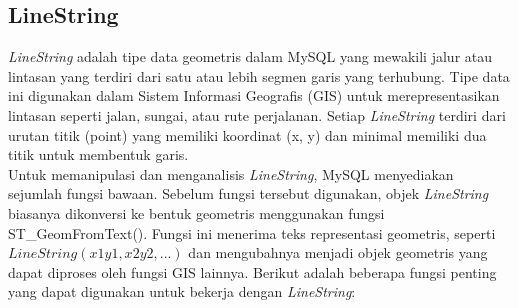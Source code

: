 \subsection{LineString ~\cite{oracle:24:mysql8.4}}
\label{subs:linestring}
\textit{LineString} adalah tipe data geometris dalam MySQL yang mewakili jalur atau lintasan yang terdiri dari satu atau lebih segmen garis yang terhubung. Tipe data ini digunakan dalam Sistem Informasi Geografis (GIS) untuk merepresentasikan lintasan seperti jalan, sungai, atau rute perjalanan. Setiap \textit{LineString} terdiri dari urutan titik (point) yang memiliki koordinat (x, y) dan minimal memiliki dua titik untuk membentuk garis.
\\
Untuk memanipulasi dan menganalisis \textit{LineString}, MySQL menyediakan sejumlah fungsi bawaan. Sebelum fungsi tersebut digunakan, objek \textit{LineString} biasanya dikonversi ke bentuk geometris menggunakan fungsi ST\_GeomFromText(). Fungsi ini menerima teks representasi geometris, seperti $LineString(x1 y1, x2 y2, ...)$ dan mengubahnya menjadi objek geometris yang dapat diproses oleh fungsi GIS lainnya.
Berikut adalah beberapa fungsi penting yang dapat digunakan untuk bekerja dengan \textit{LineString}:
